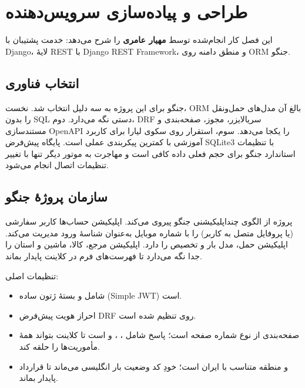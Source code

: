 \chapter[پیاده‌سازی سرویس‌دهنده]{طراحی و پیاده‌سازی سرویس‌دهنده}

این فصل کار انجام‌شده توسط \textbf{مهیار عامری} را شرح می‌دهد: خدمت پشتیبان با \textenglish{Django}، لایهٔ \textenglish{REST} با \textenglish{Django REST Framework}، و منطق دامنه روی \textenglish{ORM} جنگو.

\section{انتخاب فناوری}

جنگو برای این پروژه به سه دلیل انتخاب شد. نخست، \textenglish{ORM} بالغ آن مدل‌های حمل‌ونقل را بدون \textenglish{SQL} دستی نگه می‌دارد. دوم، \textenglish{DRF} سریالایزر، مجوز، صفحه‌بندی و مستندسازی \textenglish{OpenAPI} را یکجا می‌دهد. سوم، استقرار روی سکوی لیارا برای کاربرد آموزشی با کمترین پیکربندی عملی است. پایگاه پیش‌فرض \textenglish{SQLite3} با تنظیمات استاندارد جنگو برای حجم فعلی داده کافی است و مهاجرت به موتور دیگر تنها با تغییر تنظیمات اتصال انجام می‌شود.

\section{سازمان پروژهٔ جنگو}

پروژه از الگوی چنداپلیکیشنی جنگو پیروی می‌کند. اپلیکیشن حساب‌ها کاربر سفارشی (یا پروفایل متصل به کاربر) را با شماره موبایل به‌عنوان شناسهٔ ورود مدیریت می‌کند. اپلیکیشن حمل، مدل بار و تخصیص را دارد. اپلیکیشن مرجع، کالا، ماشین و استان را جدا نگه می‌دارد تا فهرست‌های فرم در کلاینت پایدار بماند.

تنظیمات اصلی:

\begin{itemize}
  \item {} شامل  و بستهٔ ژتون ساده (\textenglish{Simple JWT}) است.
  \item احراز هویت پیش‌فرض \textenglish{DRF} روی  تنظیم شده است.
  \item صفحه‌بندی از نوع شماره صفحه است؛ پاسخ شامل ، ،  و  است تا کلاینت بتواند همهٔ مأموریت‌ها را حلقه کند.
  \item {} و منطقه متناسب با ایران است؛ خودِ کد وضعیت بار انگلیسی می‌ماند تا قرارداد پایدار بماند.
\end{itemize}


